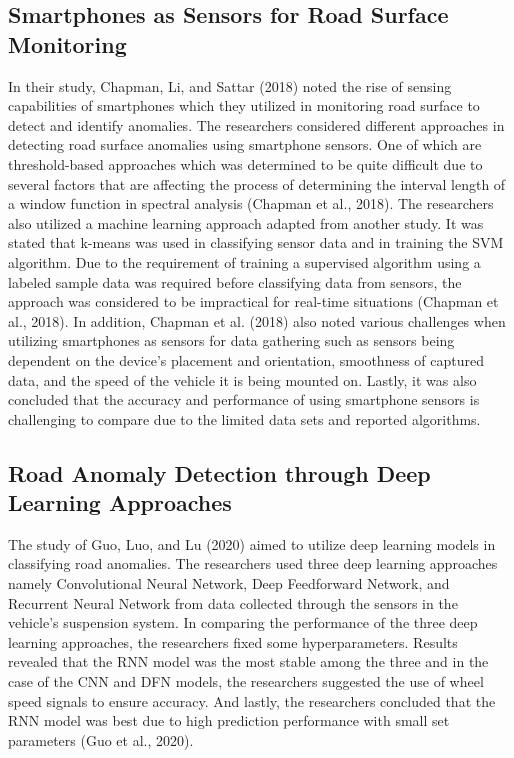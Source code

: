 \subsection{Smartphones as Sensors for Road Surface Monitoring}
In their study, Chapman, Li, and Sattar (2018) noted the rise of sensing capabilities of smartphones which they utilized in monitoring road surface to detect and identify anomalies. The researchers considered different approaches in detecting road surface anomalies using smartphone sensors. One of which are threshold-based approaches which was determined to be quite difficult  due to several factors that are affecting the process of determining the interval length of a window function in spectral analysis (Chapman et al., 2018). The researchers also utilized a machine learning approach adapted from another study. It was stated that k-means was used in classifying sensor data and in training the SVM algorithm. Due to the requirement of training a supervised algorithm using a labeled sample data was required before classifying data from sensors, the approach was considered to be impractical for real-time situations (Chapman et al., 2018). In addition, Chapman et al. (2018) also noted various challenges when utilizing smartphones as sensors for data gathering such as sensors being dependent on the device’s placement and orientation, smoothness of captured data, and the speed of the vehicle it is being mounted on. Lastly, it was also concluded that the accuracy and performance of using smartphone sensors is challenging to compare due to the limited data sets and reported algorithms.


\subsection{Road Anomaly Detection through Deep Learning Approaches}
The study of Guo, Luo, and Lu (2020) aimed to utilize deep learning models in classifying road anomalies. The researchers used three deep learning approaches namely Convolutional Neural Network, Deep Feedforward Network, and Recurrent Neural Network from data collected through the sensors in the vehicle's suspension system. In comparing the performance of the three deep learning approaches, the researchers fixed some hyperparameters. Results revealed that the RNN model was the most stable among the three and in the case of the CNN and DFN models, the researchers suggested the use of wheel speed signals to ensure accuracy. And lastly, the researchers concluded that the RNN model was best due to high prediction performance with small set parameters (Guo et al., 2020).


